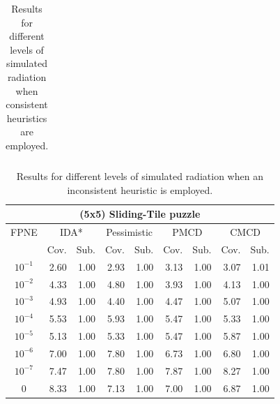 \documentclass{article}
\begin{document}
\begin{table}[t]
\begin{tabular}{| c | r  r | r  r | r  r | r  r |}
\end{tabular}
\caption{Results for different levels of simulated radiation when consistent heuristics are employed.}
\label{tab:results}
\end{table}


\begin{table}[t]
\centering
\setlength{\tabcolsep}{4.0 pt}
\begin{tabular}{| c | r  r | r  r | r  r | r  r |}
\hline
\multicolumn{9}{|c|}{\textbf{(5x5) Sliding-Tile puzzle}} \\
\hline
FPNE     & \multicolumn{2}{|c|}{IDA*}    & \multicolumn{2}{|c|}{Pessimistic}     & \multicolumn{2}{|c|}{PMCD}    & \multicolumn{2}{|c|}{CMCD}    \\
\hline
        & \multicolumn{1}{c}{Cov.} & \multicolumn{1}{c|}{Sub.}  & \multicolumn{1}{c}{Cov.} & \multicolumn{1}{c|}{Sub.}  & \multicolumn{1}{c}{Cov.} & \multicolumn{1}{c|}{Sub.}  & \multicolumn{1}{c}{Cov.} & \multicolumn{1}{c|}{Sub.}  \\
\hline
$10^{-1}$	 & 2.60	 & 1.00	 & 2.93	 & 1.00	 & 3.13	 & 1.00	 & 3.07	 & 1.01	\\
$10^{-2}$	 & 4.33	 & 1.00	 & 4.80	 & 1.00	 & 3.93	 & 1.00	 & 4.13	 & 1.00	\\
$10^{-3}$	 & 4.93	 & 1.00	 & 4.40	 & 1.00	 & 4.47	 & 1.00	 & 5.07	 & 1.00	\\
$10^{-4}$	 & 5.53	 & 1.00	 & 5.93	 & 1.00	 & 5.47	 & 1.00	 & 5.33	 & 1.00	\\
$10^{-5}$	 & 5.13	 & 1.00	 & 5.33	 & 1.00	 & 5.47	 & 1.00	 & 5.87	 & 1.00	\\
$10^{-6}$	 & 7.00	 & 1.00	 & 7.80	 & 1.00	 & 6.73	 & 1.00	 & 6.80	 & 1.00	\\
$10^{-7}$	 & 7.47	 & 1.00	 & 7.80	 & 1.00	 & 7.87	 & 1.00	 & 8.27	 & 1.00	\\
0 	 & 8.33	 & 1.00 	 & 7.13	 & 1.00 	 & 7.00	 & 1.00 	 & 6.87	 & 1.00 	\\
\hline
\end{tabular}
\caption{Results for different levels of simulated radiation when an inconsistent heuristic is employed.}
\label{tab:24puzzle}
\end{table}
\end{document}

